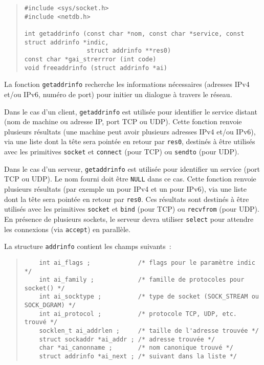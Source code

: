 \documentclass [twoside] {report}
\begin{document}
\begin {quote}
\begin {verbatim}
#include <sys/socket.h>
#include <netdb.h>

int getaddrinfo (const char *nom, const char *service, const struct addrinfo *indic,
                 struct addrinfo **res0)
const char *gai_strerrror (int code)
void freeaddrinfo (struct addrinfo *ai)
\end{verbatim}
\end {quote}

La fonction \texttt {getaddrinfo} recherche les informations
nécessaires (adresses IPv4 et/ou IPv6, numéro de port) pour initier
un dialogue à travers le réseau.

Dans le cas d'un client, \texttt {getaddrinfo} est utilisée pour
identifier le service distant (nom de machine ou adresse IP, port
TCP ou UDP).  Cette fonction renvoie plusieurs résultats (une machine
peut avoir plusieurs adresses IPv4 et/ou IPv6), via une liste dont
la tête sera pointée en retour par \texttt {res0}, destinés à être
utilisés avec les primitives \texttt {socket} et \texttt {connect}
(pour TCP) ou \texttt {sendto} (pour UDP).

Dans le cas d'un serveur, \texttt {getaddrinfo} est utilisée pour
identifier un service (port TCP ou UDP). Le nom fourni doit être
\texttt {NULL} dans ce cas. Cette fonction renvoie plusieurs résultats
(par exemple un pour IPv4 et un pour IPv6), via une liste dont la
tête sera pointée en retour par \texttt {res0}. Ces résultats sont
destinés à être utilisés avec les primitives \texttt {socket} et
\texttt {bind} (pour TCP) ou \texttt {recvfrom} (pour UDP). En
présence de plusieurs sockets, le serveur devra utiliser \texttt
{select} pour attendre les connexions (via \texttt {accept}) en
parallèle.

La structure \texttt {addrinfo} contient les champs suivants~:

\begin {quote}
    \small
\begin {verbatim}
    int ai_flags ;             /* flags pour le paramètre indic */
    int ai_family ;            /* famille de protocoles pour socket() */
    int ai_socktype ;          /* type de socket (SOCK_STREAM ou SOCK_DGRAM) */
    int ai_protocol ;          /* protocole TCP, UDP, etc. trouvé */
    socklen_t ai_addrlen ;     /* taille de l'adresse trouvée */
    struct sockaddr *ai_addr ; /* adresse trouvée */
    char *ai_canonname ;       /* nom canonique trouvé */
    struct addrinfo *ai_next ; /* suivant dans la liste */
\end{verbatim}
\end {quote}
\end{document}
